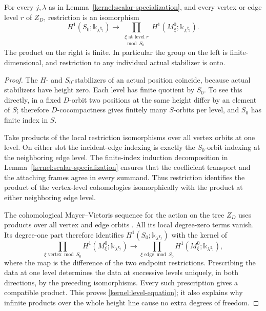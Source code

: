 \begin{proposition}\label{kernel:level-cohomology}
For every \(j,\lambda\) as in
Lemma~\ref{kernel:scalar-specialization}, and every vertex or edge level
\(r\) of \(Z_D\), restriction is an isomorphism
\[
 H^1(S_0;\mathbb k_{\lambda^{\chi_j}})
       \longrightarrow
 \prod_{\substack{\xi\text{ at level }r\\\bmod S_0}}
       H^1(M_\xi^0;\mathbb k_{\lambda^{\chi_j}}).
 \tag{K1}\label{kernel:level-equation}
\]
The product on the right is finite.  In particular the group on the
left is finite-dimensional, and restriction to any individual actual
stabilizer is onto.
\end{proposition}

\begin{proof}
The \(H\)- and \(S_0\)-stabilizers of an actual position coincide,
because actual stabilizers have height zero.  Each level has finite
quotient by \(S_0\).  To see this directly, in a fixed \(D\)-orbit two
positions at the same height differ by an element of \(S\);
therefore \(D\)-cocompactness gives finitely many \(S\)-orbits per
level, and \(S_0\) has finite index in \(S\).

Take products of the local restriction isomorphisms over all vertex
orbits at one level.  On either slot the incident-edge indexing is
exactly the \(S_0\)-orbit indexing at the neighboring edge level.
The finite-index induction decomposition in
Lemma~\ref{kernel:scalar-specialization} ensures that the coefficient
transport and the attaching frames agree in every summand.
Thus restriction identifies the product of the vertex-level
cohomologies isomorphically with the product at either neighboring
edge level.

The cohomological Mayer--Vietoris sequence for the action on the tree
\(Z_D\) uses products over all vertex and edge orbits
\cite{Brown1982,Serre1980}.  All its local degree-zero terms vanish.
Its degree-one part therefore identifies
\(H^1(S_0;\mathbb k_{\lambda^{\chi_j}})\) with the kernel of
\[
 \prod_{\xi\text{ vertex}\bmod S_0}H^1(M_\xi^0;\mathbb k_{\lambda^{\chi_j}})
 \longrightarrow
 \prod_{\xi\text{ edge}\bmod S_0}H^1(M_\xi^0;\mathbb k_{\lambda^{\chi_j}}),
\]
where the map is the difference of the two endpoint restrictions.
Prescribing the data at one level determines the data at successive
levels uniquely, in both directions, by the preceding isomorphisms.
Every such prescription gives a compatible product.  This proves
\eqref{kernel:level-equation}; it also explains why infinite products
over the whole height line cause no extra degrees of freedom.
\end{proof}

